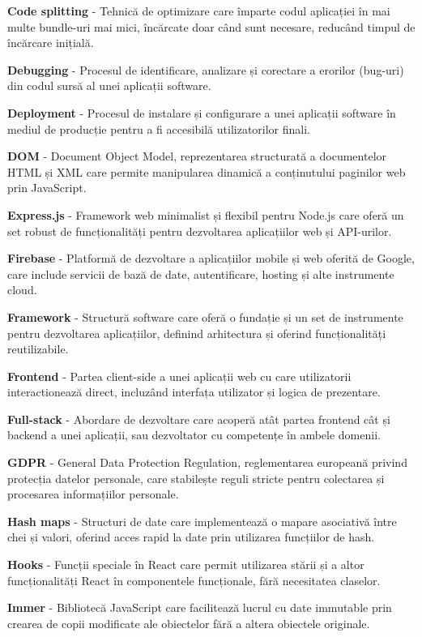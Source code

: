 \documentclass[12pt,a4paper]{report}
\begin{document}
\textbf{Code splitting} - Tehnică de optimizare care împarte codul aplicației în mai multe bundle-uri mai mici, încărcate doar când sunt necesare, reducând timpul de încărcare inițială.

\textbf{Debugging} - Procesul de identificare, analizare și corectare a erorilor (bug-uri) din codul sursă al unei aplicații software.

\textbf{Deployment} - Procesul de instalare și configurare a unei aplicații software în mediul de producție pentru a fi accesibilă utilizatorilor finali.

\textbf{DOM} - Document Object Model, reprezentarea structurată a documentelor HTML și XML care permite manipularea dinamică a conținutului paginilor web prin JavaScript.

\textbf{Express.js} - Framework web minimalist și flexibil pentru Node.js \cite{nodejs} care oferă un set robust de funcționalități pentru dezvoltarea aplicațiilor web și API-urilor.

\textbf{Firebase} - Platformă de dezvoltare a aplicațiilor mobile și web oferită de Google, care include servicii de bază de date, autentificare, hosting și alte instrumente cloud.

\textbf{Framework} - Structură software care oferă o fundație și un set de instrumente pentru dezvoltarea aplicațiilor, definind arhitectura și oferind funcționalități reutilizabile.

\textbf{Frontend} - Partea client-side a unei aplicații web cu care utilizatorii interactionează direct, incluzând interfața utilizator și logica de prezentare.

\textbf{Full-stack} - Abordare de dezvoltare care acoperă atât partea frontend cât și backend a unei aplicații, sau dezvoltator cu competențe în ambele domenii.

\textbf{GDPR} - General Data Protection Regulation, reglementarea europeană privind protecția datelor personale, care stabilește reguli stricte pentru colectarea și procesarea informațiilor personale.

\textbf{Hash maps} - Structuri de date care implementează o mapare asociativă între chei și valori, oferind acces rapid la date prin utilizarea funcțiilor de hash.

\textbf{Hooks} - Funcții speciale în React care permit utilizarea stării și a altor funcționalități React în componentele funcționale, fără necesitatea claselor.

\textbf{Immer} - Bibliotecă JavaScript care facilitează lucrul cu date immutable prin crearea de copii modificate ale obiectelor fără a altera obiectele originale.
\end{document}
